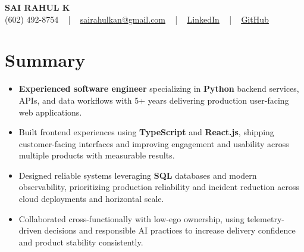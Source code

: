 \documentclass[letterpaper,11pt]{article}
\newcommand{\resumeItem}[1]{
  \item\footnotesize{
    {#1 \vspace{-2pt}}
  }
}
\newcommand{\resumeItemListStart}{\begin{itemize}[leftmargin=*]}
\newcommand{\resumeItemListEnd}{\end{itemize}\vspace{-5pt}}
\begin{document}
\begin{center}
    {\fontsize{14pt}{12pt}\selectfont \textbf{\MakeUppercase{Sai Rahul K}}}\\ \vspace{2pt}
    \fontsize{10pt}{12pt}\selectfont (602) 492-8754 ~ | ~ \href{mailto:sairahulkan@gmail.com}{sairahulkan@gmail.com} ~ | ~
    \href{https://www.linkedin.com/in/rq123/}{\color{blue}\underline{LinkedIn}} ~ | ~
    \href{https://github.com/kanrahuldo}{\color{blue}\underline{GitHub}}~
    \vspace{-8pt}
\end{center}

\section{Summary}
\fontsize{9pt}{10pt}\selectfont
\resumeItemListStart
    \resumeItem{\textbf{Experienced software engineer} specializing in \textbf{Python} backend services, APIs, and data workflows with 5+ years delivering production user-facing web applications.} \vspace{-3pt}
    \resumeItem{Built frontend experiences using \textbf{TypeScript} and \textbf{React.js}, shipping customer-facing interfaces and improving engagement and usability across multiple products with measurable results.} \vspace{-3pt}
    \resumeItem{Designed reliable systems leveraging \textbf{SQL} databases and modern observability, prioritizing production reliability and incident reduction across cloud deployments and horizontal scale.} \vspace{-3pt}
    \resumeItem{Collaborated cross-functionally with low-ego ownership, using telemetry-driven decisions and responsible AI practices to increase delivery confidence and product stability consistently.} \vspace{-3pt}
\resumeItemListEnd
\vspace{-6pt}
\end{document}

